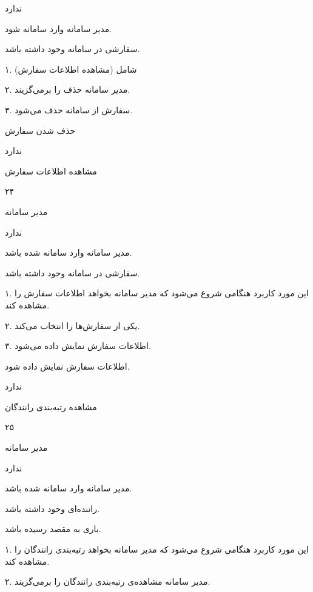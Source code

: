 ندارد

مدیر سامانه وارد سامانه شود.

سفارشی در سامانه وجود داشته باشد.


۱. شامل (مشاهده اطلاعات سفارش)

۲. مدیر سامانه حذف را برمی‌گزیند.

۳. سفارش از سامانه حذف می‌شود.

حذف شدن سفارش

ندارد

\newpage

مشاهده اطلاعات سفارش

۲۴


مدیر سامانه

ندارد


مدیر سامانه وارد سامانه شده باشد.

سفارشی در سامانه وجود داشته باشد.


۱. این مورد کاربرد هنگامی شروع می‌شود که مدیر سامانه بخواهد اطلاعات سفارش را مشاهده کند.

۲. یکی از سفارش‌ها را انتخاب می‌کند.

۳. اطلاعات سفارش نمایش داده می‌شود.

اطلاعات سفارش نمایش داده شود.

ندارد

\newpage

مشاهده رتبه‌بندی رانندگان

۲۵

مدیر سامانه

ندارد


مدیر سامانه وارد سامانه شده باشد.

راننده‌ای وجود داشته باشد.

باری به مقصد رسیده باشد.


۱. این مورد کاربرد هنگامی شروع می‌شود که مدیر سامانه بخواهد رتبه‌بندی رانندگان را مشاهده کند.

۲. مدیر سامانه مشاهده‌ی رتبه‌بندی رانندگان را برمی‌گزیند.

